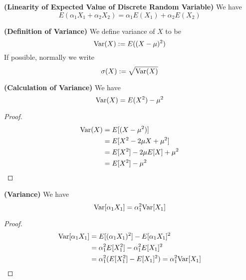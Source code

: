 \documentclass{report}
\begin{document}
\begin{theorem}
\label{1.1.6}
\textbf{(Linearity of Expected Value of Discrete Random Variable)} We have
\begin{equation}
E(\alpha _1 X_1 +\alpha_2 X_2)=\alpha_1 E(X_1)+\alpha _2 E(X_2)
\end{equation}
\end{theorem}
\begin{definition}
\label{1.1.7}
\textbf{(Definition of Variance)} We define variance of $X$ to be
\begin{equation}
\text{Var} (X):=E((X-\mu)^2)
\end{equation}
If possible, normally we write
\begin{equation}
  \sigma(X):=\sqrt{\text{Var} (X)}
\end{equation}
\end{definition}
\begin{theorem}
\label{1.1.8}
\textbf{(Calculation of Variance)} We have
\begin{equation}
\text{Var} (X)=E(X^2)-\mu^2
\end{equation}
\end{theorem}
\begin{proof}
\begin{align}
\text{Var} (X)&=E[(X-\mu^2)]\\
&=E[X^2-2\mu X +\mu^2]\\
&=E[X^2]-2\mu E[X]+\mu^2\\
&=E[X^2]-\mu^2
\end{align}
\end{proof}
\begin{theorem}
\label{1.1.9}
\textbf{(Variance)} We have
\begin{equation}
\text{Var} [\alpha_1 X_1]=\alpha _1^2\text{Var} [X_1]
\end{equation}
\end{theorem}
\begin{proof}
\begin{align}
\text{Var} [\alpha _1 X_1]&=E[(\alpha _1X_1)^2]-E[\alpha _1X_1]^2\\
&=\alpha _1^2E[X_1^2]-\alpha _1^2E[X_1]^2\\
&=\alpha _1^2 (E[X_1^2]-E[X_1]^2)=\alpha _1^2 \text{Var} [X_1]
\end{align}
\end{proof}
\end{document}
